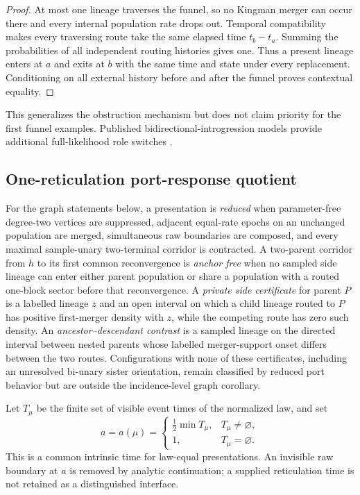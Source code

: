 \documentclass[11pt]{article}
\begin{document}
\begin{proof}
At most one lineage traverses the funnel, so no Kingman merger can occur there and every internal population rate drops out.  Temporal compatibility makes every traversing route take the same elapsed time $t_b-t_a$.  Summing the probabilities of all independent routing histories gives one.  Thus a present lineage enters at $a$ and exits at $b$ with the same time and state under every replacement.  Conditioning on all external history before and after the funnel proves contextual equality.
\end{proof}

This generalizes the obstruction mechanism but does not claim priority for the first funnel examples.  Published bidirectional-introgression models provide additional full-likelihood role switches \citep{YangFlouri2022}.

\subsection{One-reticulation port-response quotient}

For the graph statements below, a presentation is \emph{reduced} when parameter-free degree-two vertices are suppressed, adjacent equal-rate epochs on an unchanged population are merged, simultaneous raw boundaries are composed, and every maximal sample-unary two-terminal corridor is contracted.  A two-parent corridor from $h$ to its first common reconvergence is \emph{anchor free} when no sampled side lineage can enter either parent population or share a population with a routed one-block sector before that reconvergence.  A \emph{private side certificate} for parent $P$ is a labelled lineage $z$ and an open interval on which a child lineage routed to $P$ has positive first-merger density with $z$, while the competing route has zero such density.  An \emph{ancestor--descendant contrast} is a sampled lineage on the directed interval between nested parents whose labelled merger-support onset differs between the two routes.  Configurations with none of these certificates, including an unresolved bi-unary sister orientation, remain classified by reduced port behavior but are outside the incidence-level graph corollary.

Let $T_\mu$ be the finite set of visible event times of the normalized law, and set
\[
a=a(\mu)=\begin{cases}\tfrac12\min T_\mu,&T_\mu\ne\varnothing,\\1,&T_\mu=\varnothing.\end{cases}
\]
This is a common intrinsic time for law-equal presentations.  An invisible raw boundary at $a$ is removed by analytic continuation; a supplied reticulation time is not retained as a distinguished interface.
\end{document}

